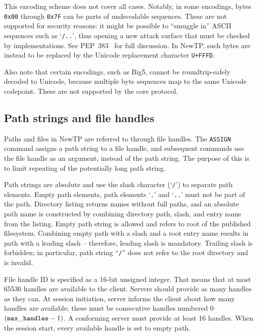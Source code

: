 This encoding scheme does not cover all cases. Notably, in some encodings, bytes {\tt 0x00} through {\tt 0x7F}
can be parts of undecodable sequences. These are not supported for security reasons: it might be possible to
``smuggle in'' ASCII sequences such as `{\tt /..}', thus opening a new attack surface that must be checked by
implementations. See PEP~383~\cite{pep383} for full discussion. In NewTP, such bytes are instead to be
replaced by the Unicode replacement character {\tt U+FFFD}.

Also note that certain encodings, such as Big5, cannot be roundtrip-safely decoded to Unicode, because
multiple byte sequences map to the same Unicode codepoint. These are not supported by the core protocol.

%

\subsection{Path strings and file handles}
\label{ssec:paths}

Paths and files in NewTP are referred to through file handles. The {\tt ASSIGN} command assigns a path string
to a file handle, and subsequent commands use the file handle as an argument, instead of the path string. The
purpose of this is to limit repeating of the potentially long path string.

Path strings are absolute and use the slash character (`{\tt /}') to separate path elements. Empty path
elements, path elements `{\tt .}' and `{\tt ..}' must not be part of the path. Directory listing returns names
without full paths, and an absolute path name is constructed by combining directory path, slash, and entry
name from the listing. Empty path string is allowed and refers to root of the published filesystem. Combining
empty path with a slash and a root entry name results in path with a leading slash -- therefore, leading slash
is mandatory. Trailing slash is forbidden; in particular, path string ``{\tt /}'' does not refer to the root
directory and is invalid.

File handle ID is specified as a 16-bit unsigned integer. That means that at most 65536 handles are available
to the client. Servers should provide as many handles as they can. At session initiation, server informs the
client about how many handles are available; these must be consecutive handles numbered 0--$({\tt max\_handles}
- 1)$. A conforming server must provide at least 16 handles. When the session start, every available handle is
set to empty path.

